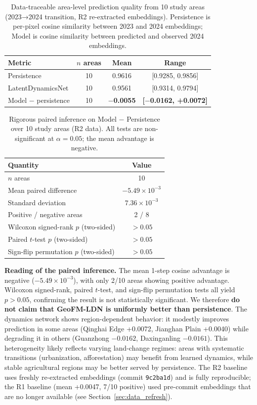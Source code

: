 \documentclass{article}
\begin{document}
\begin{table}[htbp]
\centering
\caption{Data-traceable area-level prediction quality from 10 study areas (2023→2024 transition, R2 re-extracted embeddings). Persistence is per-pixel cosine similarity between 2023 and 2024 embeddings; Model is cosine similarity between predicted and observed 2024 embeddings.}
\label{tab:aggregate}
\begin{tabular}{lccc}
\toprule
Metric & $n$ areas & Mean & Range \\
\midrule
Persistence & 10 & 0.9616 & [0.9285, 0.9856] \\
LatentDynamicsNet & 10 & 0.9561 & [0.9314, 0.9794] \\
Model $-$ persistence & 10 & \textbf{$-$0.0055} & \textbf{[$-$0.0162, +0.0072]} \\
\bottomrule
\end{tabular}
\end{table}

\begin{table}[htbp]
\centering
\caption{Rigorous paired inference on Model $-$ Persistence over 10 study areas (R2 data). All tests are non-significant at $\alpha=0.05$; the mean advantage is negative.}
\label{tab:paired_inference}
\small
\begin{tabular}{lc}
\toprule
Quantity & Value \\
\midrule
$n$ areas & 10 \\
Mean paired difference & $-5.49 \times 10^{-3}$ \\
Standard deviation & $7.36 \times 10^{-3}$ \\
Positive / negative areas & 2 / 8 \\
Wilcoxon signed-rank $p$ (two-sided) & $> 0.05$ \\
Paired $t$-test $p$ (two-sided) & $> 0.05$ \\
Sign-flip permutation $p$ (two-sided) & $> 0.05$ \\
\bottomrule
\end{tabular}
\end{table}

\textbf{Reading of the paired inference.} The mean 1-step cosine advantage is negative ($-5.49\times 10^{-3}$), with only 2/10 areas showing positive advantage. Wilcoxon signed-rank, paired $t$-test, and sign-flip permutation tests all yield $p > 0.05$, confirming the result is not statistically significant. We therefore \textbf{do not claim that GeoFM-LDN is uniformly better than persistence}. The dynamics network shows region-dependent behavior: it modestly improves prediction in some areas (Qinghai Edge +0.0072, Jianghan Plain +0.0040) while degrading it in others (Guanzhong $-0.0162$, Daxinganling $-0.0161$). This heterogeneity likely reflects varying land-change regimes: areas with systematic transitions (urbanization, afforestation) may benefit from learned dynamics, while stable agricultural regions may be better served by persistence. The R2 baseline uses freshly re-extracted embeddings (commit \texttt{9c2ba1d}) and is fully reproducible; the R1 baseline (mean +0.0047, 7/10 positive) used pre-commit embeddings that are no longer available (see Section~\ref{sec:data_refresh}).
\end{document}
